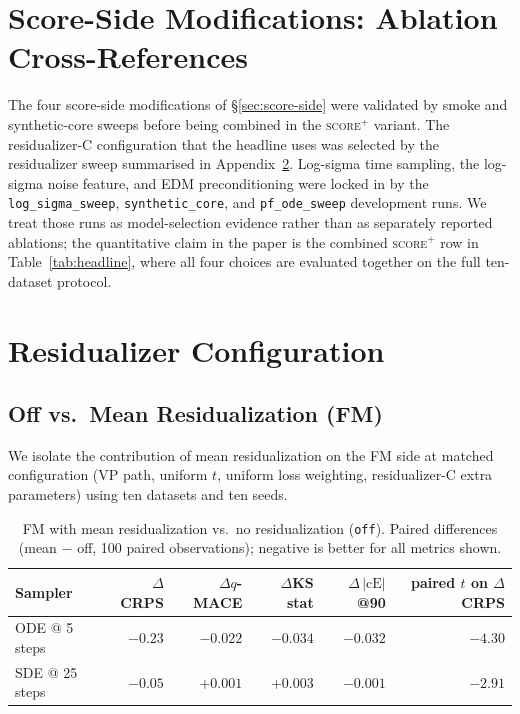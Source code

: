 \documentclass{uai2026}
\begin{document}
\section{Score-Side Modifications: Ablation Cross-References}\label{app:score-side}

The four score-side modifications of \S\ref{sec:score-side} were validated by smoke and synthetic-core sweeps before being combined in the \textsc{score$^+$} variant.
The residualizer-C configuration that the headline uses was selected by the residualizer sweep summarised in Appendix~\ref{app:resid-config}. Log-sigma time sampling, the log-sigma noise feature, and EDM preconditioning were locked in by the \texttt{log\_sigma\_sweep}, \texttt{synthetic\_core}, and \texttt{pf\_ode\_sweep} development runs. We treat those runs as model-selection evidence rather than as separately reported ablations; the quantitative claim in the paper is the combined \textsc{score$^+$} row in Table~\ref{tab:headline}, where all four choices are evaluated together on the full ten-dataset protocol.

\section{Residualizer Configuration}\label{app:resid-config}

\subsection{Off vs.\ Mean Residualization (FM)}\label{app:off-vs-mean}

We isolate the contribution of mean residualization on the FM side at matched configuration (VP path, uniform $t$, uniform loss weighting, residualizer-C extra parameters) using ten datasets and ten seeds.

\begin{table}[!h]
  \centering
  \caption{FM with mean residualization vs.\ no residualization (\texttt{off}). Paired differences (mean $-$ off, 100 paired observations); negative is better for all metrics shown.}\label{tab:off-vs-mean}
  \footnotesize
  \begin{tabular}{lrrrrr}
    \toprule
    Sampler & $\Delta$CRPS & $\Delta q$-MACE & $\Delta$KS stat & $\Delta\,|\text{cE}|$@90 & paired $t$ on $\Delta$CRPS \\
    \midrule
    ODE @ 5 steps  & $-0.23$ & $-0.022$ & $-0.034$ & $-0.032$ & $-4.30$ \\
    SDE @ 25 steps & $-0.05$ & $+0.001$ & $+0.003$ & $-0.001$ & $-2.91$ \\
    \bottomrule
  \end{tabular}
\end{table}
\end{document}
